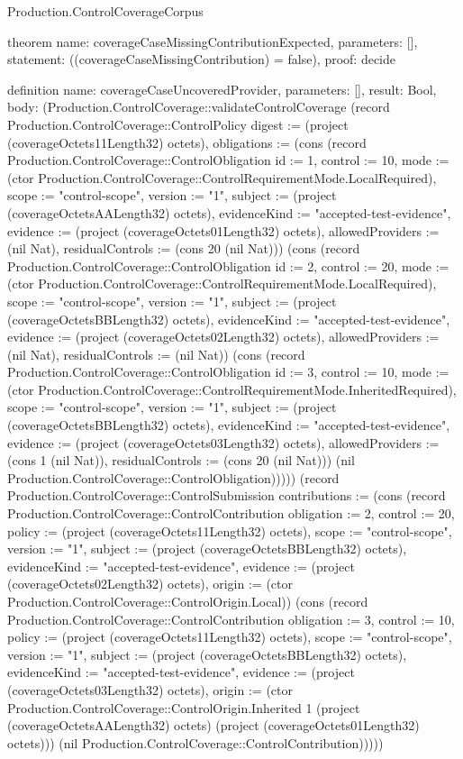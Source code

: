 \begin{lexlean}{Production.ControlCoverageCorpus}
\begin{semanticmodule}
theorem{
  name: coverageCaseMissingContributionExpected,
  parameters: [],
  statement: ((coverageCaseMissingContribution) = false),
  proof: decide{}
}

definition{
  name: coverageCaseUncoveredProvider,
  parameters: [],
  result: Bool,
  body: (Production.ControlCoverage::validateControlCoverage (record Production.ControlCoverage::ControlPolicy {digest := (project (coverageOctets11Length32) octets), obligations := (cons (record Production.ControlCoverage::ControlObligation {id := 1, control := 10, mode := (ctor Production.ControlCoverage::ControlRequirementMode.LocalRequired), scope := "control-scope", version := "1", subject := (project (coverageOctetsAALength32) octets), evidenceKind := "accepted-test-evidence", evidence := (project (coverageOctets01Length32) octets), allowedProviders := (nil Nat), residualControls := (cons 20 (nil Nat))}) (cons (record Production.ControlCoverage::ControlObligation {id := 2, control := 20, mode := (ctor Production.ControlCoverage::ControlRequirementMode.LocalRequired), scope := "control-scope", version := "1", subject := (project (coverageOctetsBBLength32) octets), evidenceKind := "accepted-test-evidence", evidence := (project (coverageOctets02Length32) octets), allowedProviders := (nil Nat), residualControls := (nil Nat)}) (cons (record Production.ControlCoverage::ControlObligation {id := 3, control := 10, mode := (ctor Production.ControlCoverage::ControlRequirementMode.InheritedRequired), scope := "control-scope", version := "1", subject := (project (coverageOctetsBBLength32) octets), evidenceKind := "accepted-test-evidence", evidence := (project (coverageOctets03Length32) octets), allowedProviders := (cons 1 (nil Nat)), residualControls := (cons 20 (nil Nat))}) (nil Production.ControlCoverage::ControlObligation))))}) (record Production.ControlCoverage::ControlSubmission {contributions := (cons (record Production.ControlCoverage::ControlContribution {obligation := 2, control := 20, policy := (project (coverageOctets11Length32) octets), scope := "control-scope", version := "1", subject := (project (coverageOctetsBBLength32) octets), evidenceKind := "accepted-test-evidence", evidence := (project (coverageOctets02Length32) octets), origin := (ctor Production.ControlCoverage::ControlOrigin.Local)}) (cons (record Production.ControlCoverage::ControlContribution {obligation := 3, control := 10, policy := (project (coverageOctets11Length32) octets), scope := "control-scope", version := "1", subject := (project (coverageOctetsBBLength32) octets), evidenceKind := "accepted-test-evidence", evidence := (project (coverageOctets03Length32) octets), origin := (ctor Production.ControlCoverage::ControlOrigin.Inherited 1 (project (coverageOctetsAALength32) octets) (project (coverageOctets01Length32) octets))}) (nil Production.ControlCoverage::ControlContribution)))}))
}


\end{semanticmodule}
\end{lexlean}
